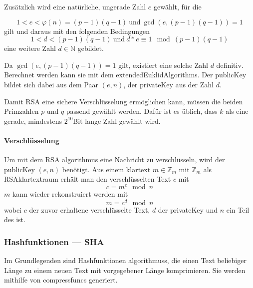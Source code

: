 Zusätzlich wird eine natürliche, ungerade Zahl $e$ gewählt, für die

\begin{equation}
    1 < e < \varphi(n) = (p - 1)(q - 1)\ \text{und}\ \gcd(e, (p-1)(q-1)) = 1\label{eq:equation2}
\end{equation}
gilt und daraus mit den folgenden Bedingungen
\begin{equation}
    1 < d < (p-1)(q-1)\ \text{und}\ d*e \equiv 1\mod(p-1)(q-1)\label{eq:equation3}
\end{equation}
eine weitere Zahl \(d \in \mathbb{N}\) gebildet.

Da $\gcd(e, (p-1)(q-1)) = 1$ gilt, existiert eine solche Zahl $d$ definitiv.
Berechnet werden kann sie mit dem \glspl{extendedEuklidAlgorithm}.
Der \gls{publicKey} bildet sich dabei aus dem Paar $(e, n)$, der \gls{privateKey} aus der Zahl $d$.\autocite[\pagef~169]{buchmann-einfuhrung-2016}

Damit \ac{RSA} eine sichere Verschlüsselung ermöglichen kann, müssen die beiden Primzahlen $p$ und $q$ passend gewählt werden.
Dafür ist es üblich, dass $k$ als eine gerade, mindestens $2^{10}$\nonbreakdash Bit lange Zahl gewählt wird.\autocite[\pagef~169]{buchmann-einfuhrung-2016}

\paragraph{Verschlüsselung}\label{par:verschluesselung}
Um mit dem \ac{RSA} \gls{algorithmus} eine Nachricht zu verschlüsseln, wird der \gls{publicKey} $(e, n)$ benötigt.
Aus einem \gls{klartext} \(m \in \mathbb{Z}_m\) mit \(\mathbb{Z}_m\) als \ac{RSA}\nonbreakdash\gls{klartextraum} erhält man den verschlüsselten Text $c$ mit
\begin{equation}
    c = m^e\mod n\label{eq:equation4}
\end{equation}
$m$ kann wieder rekonstruiert werden mit
\begin{equation}
    m = c^d \mod n\label{eq:equation5}
\end{equation}
wobei $c$ der zuvor erhaltene verschlüsselte Text, $d$ der \gls{privateKey} und $n$ ein Teil des  ist.\autocite[\pagef~6]{rsa-encryption}

\subsubsection[Hashfunktionen]{Hashfunktionen — \acf{SHA}}\label{subsubsec:hash-funktion}
Im Grundlegenden sind Hashfunktionen \glspl{algorithmus}, die einen Text beliebiger Länge zu einem neuen Text mit vorgegebener Länge komprimieren\autocite[\pagef~15]{anal-des-hash-function-2003}.
Sie werden mithilfe von \sog \glspl{compressfunc} generiert.


